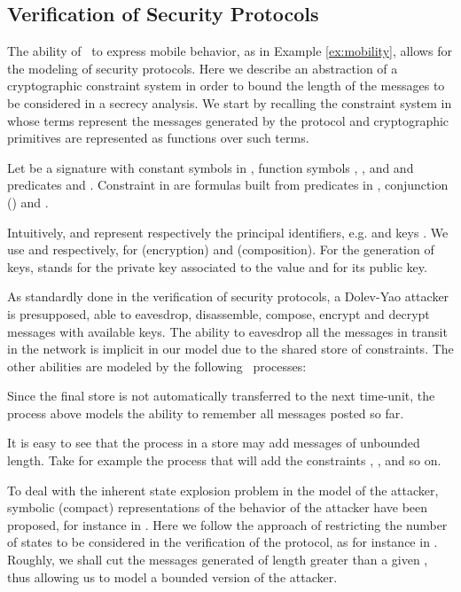 \documentclass{tlp}
\begin{document}
\subsection{Verification of Security Protocols}\label{sec:appsec}
 The ability of \utcc\ to express mobile behavior, as in Example \ref{ex:mobility},  allows for the  modeling of  security protocols. Here we describe an abstraction of a  cryptographic constraint system  in order to bound the length of the messages to be considered in a secrecy analysis. We start by recalling the constraint system in \cite{Olarte:08:SAC} whose terms represent the  messages  generated by the protocol and cryptographic  primitives are represented as functions over such terms.

\begin{definition}\label{def:css} Let   be a signature with constant symbols in , function symbols ,  ,   and  and predicates  and  . Constraint  in  are formulas 
built from predicates in , conjunction () and . 


\end{definition}

Intuitively,  and  represent respectively the  principal identifiers, e.g.    and  keys . We use  and   respectively,  for   (encryption) and    (composition).  For the generation of keys,  stands for the private key associated to the value  and  for its public key. 


As standardly done in the verification of security protocols, a Dolev-Yao attacker \cite{dolev-yao} is presupposed, able to  eavesdrop, disassemble, compose, encrypt and decrypt messages with available keys. The ability to eavesdrop all the messages in transit in the network is implicit in our model due to the shared store of constraints. The other abilities are  modeled by the following \utcc\ processes:


 Since the final store is not automatically transferred to the next time-unit, the process  above models the ability to remember all messages  posted so far.

It is easy to see that the process  in a store   may add messages of unbounded length. Take for example the process   that will add the constraints , ,  and so on. 

To deal with the inherent state explosion problem in the model of the attacker, 
symbolic (compact) representations of the behavior of the attacker 
have been proposed, for instance in 
\cite{boreale01symbolic,compsym-fiore,Olarte:08:SAC,BBD10}. Here we  follow the approach of restricting  the number of states to be considered in the verification of the protocol, as for instance  in \cite{DBLP:journals/corr/abs-1105-5282,SongBP01,DBLP:journals/ijisec/ArmandoC08}. Roughly, we  shall cut the messages generated   of length greater  than a given , thus allowing us to model a bounded version of the attacker. 
\end{document}
